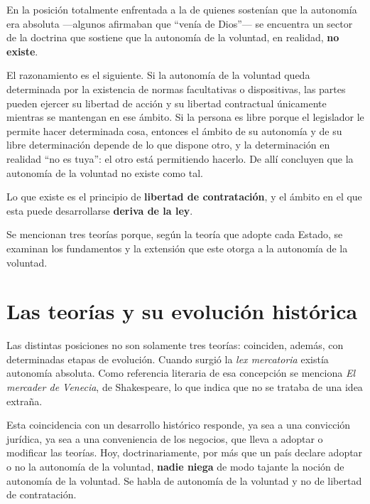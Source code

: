 \documentclass[12pt,oneside]{book}
\begin{document}
En la posici\'on totalmente enfrentada a la de quienes sosten\'ian que la autonom\'ia era absoluta ---algunos afirmaban que ``ven\'ia de Dios''--- se encuentra un sector de la doctrina que sostiene que la autonom\'ia de la voluntad, en realidad, \textbf{no existe}.

El razonamiento es el siguiente. Si la autonom\'ia de la voluntad queda determinada por la existencia de normas facultativas o dispositivas, las partes pueden ejercer su libertad de acci\'on y su libertad contractual \'unicamente mientras se mantengan en ese \'ambito. Si la persona es libre porque el legislador le permite hacer determinada cosa, entonces el \'ambito de su autonom\'ia y de su libre determinaci\'on depende de lo que dispone otro, y la determinaci\'on en realidad ``no es tuya'': el otro est\'a permitiendo hacerlo. De all\'i concluyen que la autonom\'ia de la voluntad no existe como tal.

Lo que existe es el principio de \textbf{libertad de contrataci\'on}, y el \'ambito en el que esta puede desarrollarse \textbf{deriva de la ley}.


\begin{important}
Se mencionan tres teor\'ias porque, seg\'un la teor\'ia que adopte cada Estado, se examinan los fundamentos y la extensi\'on que este otorga a la autonom\'ia de la voluntad.
\end{important}

\section{Las teor\'ias y su evoluci\'on hist\'orica}

Las distintas posiciones no son solamente tres teor\'ias: coinciden, adem\'as, con determinadas etapas de evoluci\'on. Cuando surgi\'o la \emph{lex mercatoria} exist\'ia autonom\'ia absoluta. Como referencia literaria de esa concepci\'on se menciona \emph{El mercader de Venecia}, de Shakespeare, lo que indica que no se trataba de una idea extra\~na.

Esta coincidencia con un desarrollo hist\'orico responde, ya sea a una convicci\'on jur\'idica, ya sea a una conveniencia de los negocios, que lleva a adoptar o modificar las teor\'ias. Hoy, doctrinariamente, por m\'as que un pa\'is declare adoptar o no la autonom\'ia de la voluntad, \textbf{nadie niega} de modo tajante la noci\'on de autonom\'ia de la voluntad. Se habla de autonom\'ia de la voluntad y no de libertad de contrataci\'on.
\end{document}
